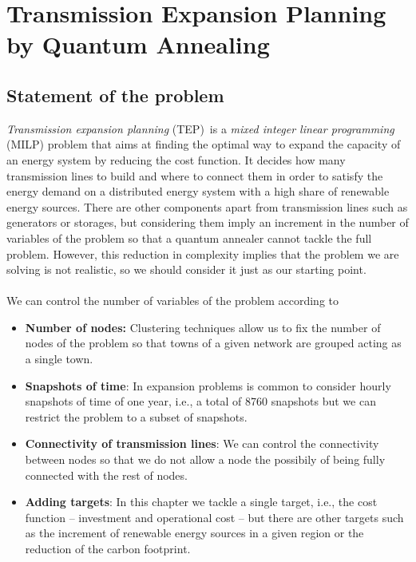 \chapter{Transmission Expansion Planning by Quantum Annealing} %
\label{Chapter4} %
\section{Statement of the problem}
\textit{Transmission expansion planning} (TEP)\,\cite{Neumann2020TransmissionFlows} is a \textit{mixed integer linear programming} (MILP) problem that aims at finding the optimal way to expand the capacity of an energy system by reducing the cost function. It decides how many transmission lines to build and where to connect them in order to satisfy the energy demand on a distributed energy system with a high share of renewable energy sources. There are other components apart from transmission lines such as generators or storages, but considering them imply an increment in the number of variables of the problem so that a quantum annealer cannot tackle the full problem. However, this reduction in complexity implies that the problem we are solving is not realistic, so we should consider it just as our starting point.\\\\
We can control the number of variables of the problem according to
\begin{itemize}
    \item \textbf{Number of nodes:} Clustering techniques allow us to fix the number of nodes of the problem so that towns of a given network are grouped acting as a single town.
    \item \textbf{Snapshots of time}: In expansion problems is common to consider hourly snapshots of time of one year, i.e., a total of 8760 snapshots but we can restrict the problem to a subset of snapshots.
    \item \textbf{Connectivity of transmission lines}: We can control the connectivity between nodes so that we do not allow a node the possibily of being fully connected with the rest of nodes.
    \item \textbf{Adding targets}: In this chapter we tackle a single target, i.e., the cost function -- investment and operational cost -- but there are other targets such as the increment of renewable energy sources in a given region or the reduction of the carbon footprint.
\end{itemize}
